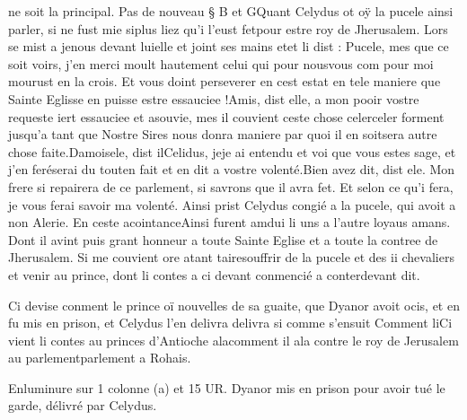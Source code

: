 \documentclass{article}
\begin{document}
\begin{pages}
      ne soit la principal. \pend 
\pstart Pas de nouveau § B et GQuant Celydus 
   ot oÿ 
   la pucele ainsi parler, 
   si ne fust mie siplus liez 
   qu’i l’eust fetpour estre roy de 
   Jherusalem. Lors se mist 
   a jenous devant luielle et joint ses mains 
   etet li dist :
   Pucele, mes que ce soit voirs, j’en merci moult hautement celui qui pour 
      nousvous com pour moi mourust 
      en la crois. 
      Et vous doint perseverer en cest estat en tele maniere que Sainte Eglisse en puisse estre essauciee !Amis, dist elle, a mon pooir vostre requeste iert 
      essauciee et
      asouvie, mes il couvient ceste chose 
      celerceler forment jusqu’a tant que Nostre Sires 
      nous donra maniere par quoi il en soitsera autre chose faite.Damoisele, dist ilCelidus, 
      jeje ai entendu et voi que vous estes sage, 
         et j’en feréserai 
      du touten fait et en dit a vostre volenté.Bien avez dit, dist ele. Mon frere si repairera de ce parlement, 
      si savrons que il avra fet. Et selon ce 
      qu’i fera, je vous ferai savoir ma volenté.
   Ainsi prist Celydus congié a la pucele, qui avoit a non 
   Alerie. En ceste acointanceAinsi 
   furent amdui li uns a l’autre loyaus amans. 
   Dont il avint puis grant honneur a toute Sainte Eglise et a toute la contree de Jherusalem. 
   Si me couvient ore atant 
      tairesouffrir de 
   la pucele et des ii chevaliers et venir au prince, 
   dont li contes a ci devant conmencié a conterdevant dit. \pend 

         
            Ci devise conment le prince 
               oï nouvelles de sa guaite, 
               que Dyanor avoit ocis, 
               et en fu mis en prison, et Celydus l’en delivra
                  delivra si comme s'ensuit
               Comment liCi vient li contes au princes d'Antioche 
                  alacomment il ala 
                  contre le roy de Jerusalem 
                  au parlementparlement a Rohais.
            
            
               Enluminure sur 1 colonne (a) et 15 UR. 
                  Dyanor mis en prison pour avoir tué 
                  le garde, 
                  délivré par Celydus.
               

\end{pages}
\end{document}
